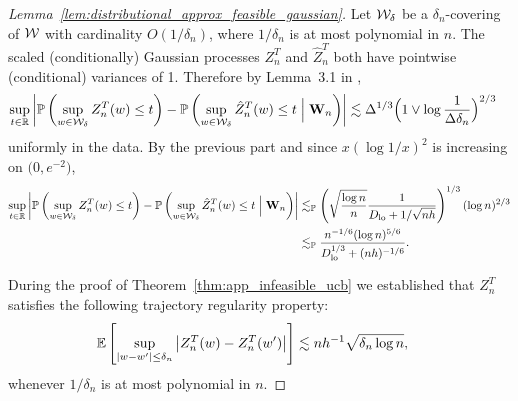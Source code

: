 \begin{proof}[Lemma~\ref{lem:distributional_approx_feasible_gaussian}]

  Let $\mathcal{W}_\delta$ be a $\delta_n$-covering of $\mathcal{W}$
  with cardinality $O(1/\delta_n)$,
  where $1/\delta_n$ is at most polynomial in $n$.
  The scaled (conditionally) Gaussian
  processes $Z_n^T$ and $\hat Z_n^T$
  both have pointwise (conditional) variances of 1.
  Therefore by Lemma~3.1 in \citet{chernozhukov2013gaussian},
  \begin{align*}
    \sup_{t \in \mathbb{R}}
    \left|
    \mathbb{P}\left(
      \sup_{w \in \mathcal{W}_\delta}
      Z_n^T(w)
      \leq t
    \right)
    - \mathbb{P}\left(
      \sup_{w \in \mathcal{W}_\delta}
      \hat Z_n^T(w)
      \leq t
      \Bigm\vert \mathbf{W}_n
    \right)
    \right|
    &\lesssim
    \Delta^{1/3}
    \Big(
    1 \vee \log \frac{1}{\Delta \delta_n}
    \Big)^{2/3}
  \end{align*}
  uniformly in the data. By the previous part and
  since $x (\log 1/x)^2$ is increasing on $\big(0, e^{-2}\big)$,
  \begin{align*}
    \sup_{t \in \mathbb{R}}
    \left|
    \mathbb{P}\left(
      \sup_{w \in \mathcal{W}_\delta}
      Z_n^T(w)
      \leq t
    \right)
    - \mathbb{P}\left(
      \sup_{w \in \mathcal{W}_\delta}
      \hat Z_n^T(w)
      \leq t
      \Bigm\vert \mathbf{W}_n
    \right)
    \right|
    &\lesssim_{\mathbb{P}}
    \left(
      \sqrt{\frac{\log n}{n}}
      \frac{1}{D_{\textup{lo}} + 1/\sqrt{nh}}
    \right)^{1/3}
    (\log n)^{2/3} \\
    &\lesssim_{\mathbb{P}}
    \frac{n^{-1/6}(\log n)^{5/6}}
    {D_{\textup{lo}}^{1/3} + (nh)^{-1/6}}.
  \end{align*}


  During the proof of
  Theorem~\ref{thm:app_infeasible_ucb}
  we established that
  $Z_n^T$ satisfies the following
  trajectory regularity property:
  \begin{align*}
    \mathbb{E}\left[
      \sup_{|w-w'| \leq \delta_n}
      \big| Z_n^T(w) - Z_n^T(w') \big|
    \right]
    &\lesssim
    n h^{-1}
    \sqrt{\delta_n \log n},
  \end{align*}
  whenever $1/\delta_n$
  is at most polynomial in $n$.



\end{proof}
